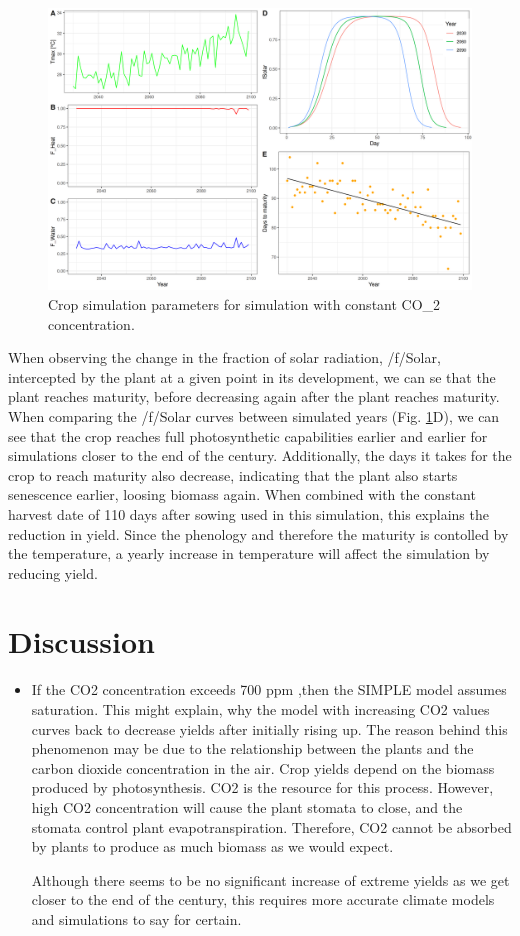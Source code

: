 \documentclass[11pt]{article}
\begin{document}
\begin{figure}[htbp]
\centering
\includegraphics[width=1\textwidth]{../results/cc-model/paras_sim.png}
\caption{\label{paras-sim}Crop simulation parameters for simulation with constant CO\_2 concentration.}
\end{figure}

When observing the change in the fraction of solar radiation, /f/Solar, intercepted by the plant at a given point in its development, we can se that the plant reaches maturity, before decreasing again after the plant reaches maturity. When comparing the /f/Solar curves between simulated years (Fig. \ref{paras-sim}D), we can see that the crop reaches full photosynthetic capabilities earlier and earlier for simulations closer to the end of the century. Additionally, the days it takes for the crop to reach maturity also decrease, indicating that the plant also starts senescence earlier, loosing biomass again. When combined with the constant harvest date of 110 days after sowing used in this simulation, this explains the reduction in yield. Since the phenology and therefore the maturity is contolled by the temperature, a yearly increase in temperature will affect the simulation by reducing yield.


\section{Discussion}
\label{sec:org0d94111}
\begin{itemize}
\item If the CO2 concentration exceeds 700 ppm ,then the SIMPLE model assumes saturation. This might explain, why the model with increasing CO2 values curves back to decrease yields after initially rising up. The reason behind this phenomenon may be due to the relationship between the plants and the carbon dioxide concentration in the air. Crop yields depend on the biomass produced by photosynthesis. CO2 is the resource for this process. However, high CO2 concentration will cause the plant stomata to close, and the stomata control plant evapotranspiration. Therefore, CO2 cannot be absorbed by plants to produce as much biomass as we would expect.

Although there seems to be no significant increase of extreme yields as we get closer to the end of the century, this requires more accurate climate models and simulations to say for certain.
\end{itemize}
\end{document}
